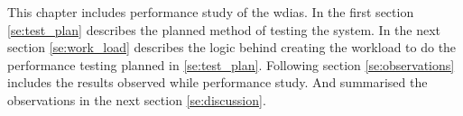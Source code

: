 
This chapter includes performance study of the \acrshort{wdias}. In the first section \ref{se:test_plan} describes the planned method of testing the system.
In the next section \ref{se:work_load} describes the logic behind creating the workload to do the performance testing planned in \ref{se:test_plan}.
Following section \ref{se:observations} includes the results observed while performance study. And summarised the observations in the next section \ref{se:discussion}.
